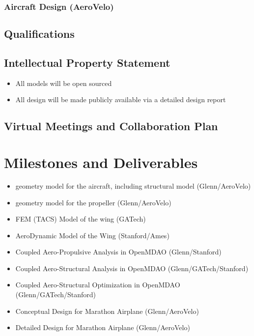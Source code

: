 \documentclass[]{aiaa-tc}
\begin{document}
        \subsubsection{Aircraft Design (AeroVelo)}

    \subsection{Qualifications}
    \subsection{Intellectual Property Statement}
        \begin{itemize}
            \item All models will be open sourced
            \item All design will be made publicly available via a detailed design report
        \end{itemize}

    \subsection{Virtual Meetings and Collaboration Plan}

\section{Milestones and Deliverables}

    \begin{itemize}
        \item geometry model for the aircraft, including structural model (Glenn/AeroVelo)
        \item geometry model for the propeller (Glenn/AeroVelo)
        \item FEM (TACS) Model of the wing (GATech)
        \item AeroDynamic Model of the Wing (Stanford/Ames)
        \item Coupled Aero-Propulsive Analysis in OpenMDAO (Glenn/Stanford)
        \item Coupled Aero-Structural Analysis in OpenMDAO (Glenn/GATech/Stanford)
        \item Coupled Aero-Structural Optimization in OpenMDAO (Glenn/GATech/Stanford)
        \item Conceptual Design for Marathon Airplane (Glenn/AeroVelo)
        \item Detailed Design for Marathon Airplane (Glenn/AeroVelo)
    \end{itemize}
\end{document}
